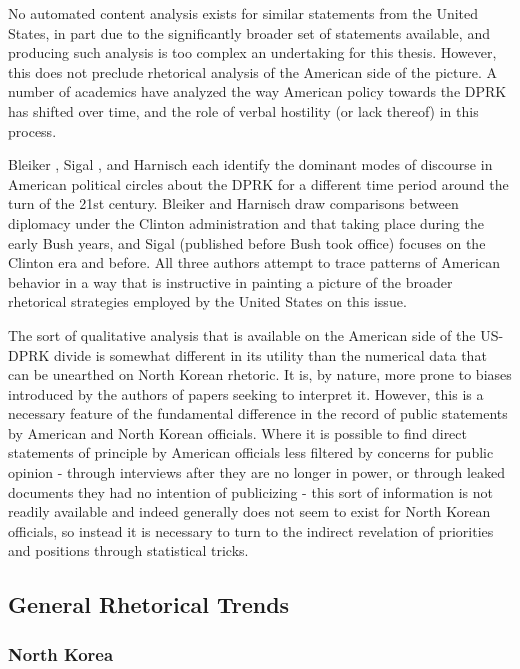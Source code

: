 \documentclass{article}
\begin{document}
No automated content analysis exists for similar statements from the United States, in part due to the significantly broader set of statements available, and producing such analysis is too complex an undertaking for this thesis. However, this does not preclude rhetorical analysis of the American side of the picture. A number of academics have analyzed the way American policy towards the DPRK has shifted over time, and the role of verbal hostility (or lack thereof) in this process.

Bleiker \cite{bleiker}, Sigal \cite{sigal}, and Harnisch \cite{harnisch} each identify the dominant modes of discourse in American political circles about the DPRK for a different time period around the turn of the 21st century. Bleiker and Harnisch draw comparisons between diplomacy under the Clinton administration and that taking place during the early Bush years, and Sigal (published before Bush took office) focuses on the Clinton era and before. All three authors attempt to trace patterns of American behavior in a way that is instructive in painting a picture of the broader rhetorical strategies employed by the United States on this issue.

The sort of qualitative analysis that is available on the American side of the US-DPRK divide is somewhat different in its utility than the numerical data that can be unearthed on North Korean rhetoric. It is, by nature, more prone to biases introduced by the authors of papers seeking to interpret it. However, this is a necessary feature of the fundamental difference in the record of public statements by American and North Korean officials. Where it is possible to find direct statements of principle by American officials less filtered by concerns for public opinion - through interviews after they are no longer in power, or through leaked documents they had no intention of publicizing - this sort of information is not readily available and indeed generally does not seem to exist for North Korean officials, so instead it is necessary to turn to the indirect revelation of priorities and positions through statistical tricks.


\subsection{General Rhetorical Trends}
\subsubsection{North Korea}
\end{document}
